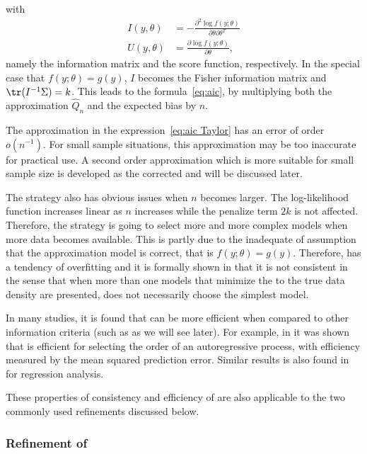 with
\begin{align}
  I(y,\theta) &=
  -\frac{\partial^2\log f(y;\theta)}{\partial\theta\partial\theta^T}\\
  U(y,\theta) &=
  \frac{\partial\log f(y;\theta)}{\partial\theta},
\end{align}
namely the information matrix and the score function, respectively. In the
special case that $f(y;\theta) = g(y)$, $I$ becomes the Fisher information
matrix and $\tr(I^{-1}\Sigma) = k$. This leads to the \aic
formula~\eqref{eq:aic}, by multiplying both the approximation $\hat{Q}_n$ and
the expected bias by $n$.

The approximation in the expression~\eqref{eq:aic Taylor} has an error of
order $o(n^{-1})$. For small sample situations, this approximation may be too
inaccurate for practical use. A second order approximation which is more
suitable for small sample size is developed as the corrected \aic and will be
discussed later.

The \aic strategy also has obvious issues when $n$ becomes larger. The
log-likelihood function increases linear as $n$ increases while the penalize
term $2k$ is not affected. Therefore, the \aic strategy is going to select
more and more complex models when more data becomes available. This is partly
due to the inadequate of assumption that the approximation model is correct,
that is $f(y;\theta) = g(y)$. Therefore, \aic has a tendency of overfitting
and it is formally shown in \cite{Sin:1996vs} that it is not consistent in the
sense that when more than one models that minimize the \kl to the true data
density are presented, \aic does not necessarily choose the simplest model.

In many studies, it is found that \aic can be more efficient when compared to
other information criteria (such as \bic as we will see later). For example,
in \cite{Lee:2001tm} it was shown that \aic is efficient for selecting the
order of an autoregressive process, with efficiency measured by the mean
squared prediction error. Similar results is also found in \cite{Yang:2005vj}
for regression analysis.

These properties of consistency and efficiency of \aic are also applicable to
the two commonly used refinements discussed below.

\subsubsection{Refinement of \protect\aic}
\label{ssub:Refinement of aic}

